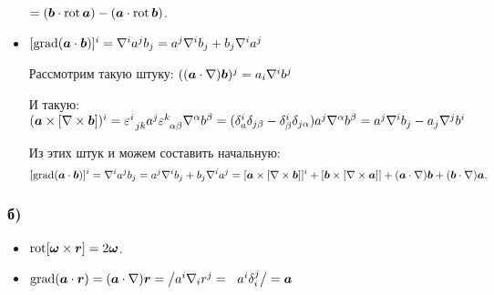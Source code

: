 \begin{itemize}
	$=(\mbox{\boldmath $b$} \cdot \mathop{\mathrm{rot}}\nolimits \mbox{\boldmath $a$}) - (\mbox{\boldmath $a$} \cdot \mathop{\mathrm{rot}}\nolimits \mbox{\boldmath $b$})$.

	\item $[\mathop{\mathrm{grad}}\nolimits(\mbox{\boldmath $a$} \cdot \mbox{\boldmath $b$})]^i = \nabla^i a^j b_j = a^j \nabla^i b_j + b_j \nabla^i a^j$

	Рассмотрим такую штуку: $((\mbox{\boldmath $a$} \cdot {\nabla}) \mbox{\boldmath $b$})^j
	=
	a_i \nabla^i b^j
	$

	И такую: $
	(\mbox{\boldmath $a$} \times [{\nabla} \times \mbox{\boldmath $b$}])^i
	=
	\varepsilon_{\phantom{0} j k}^{i} a^j \varepsilon_{\phantom{0} \alpha \beta}^{k} \nabla^\alpha b^\beta
	=
	(\delta_a^i \delta_{j \beta} - \delta_\beta^i \delta_{j \alpha}) a^j \nabla^\alpha b^\beta
	=
	a^j \nabla^i b_j - a_j \nabla^j b^i
	$

	Из этих штук и можем составить начальную:
	 $$[\mathop{\mathrm{grad}}\nolimits(\mbox{\boldmath $a$} \cdot \mbox{\boldmath $b$})]^i = \nabla^i a^j b_j = a^j \nabla^i b_j + b_j \nabla^i a^j
	 =
	 [\mbox{\boldmath $a$} \times [{\nabla} \times \mbox{\boldmath $b$}]]^i + [\mbox{\boldmath $b$} \times [{\nabla} \times \mbox{\boldmath $a$}]] + (\mbox{\boldmath $a$} \cdot {\nabla}) \mbox{\boldmath $b$} + (\mbox{\boldmath $b$} \cdot {\nabla}) \mbox{\boldmath $a$}.
	 $$
\end{itemize}

\subsubsection*{б)}
\begin{itemize}
	\item $\mathop{\mathrm{rot}}\nolimits [\mbox{\boldmath $\omega$} \times \mbox{\boldmath $r$}] = 2 \mbox{\boldmath $\omega$}$.

	\item 
	$ \grad(\vc{a} \cdot \vc{r}) = (\vc{a} \cdot {\nabla}) \vc{r} = \big/ a^i \nabla_i r^j =\phantom{\frac{1}{1}} a^i \delta_i^j \big/ = \vc{a}$
\end{itemize}


